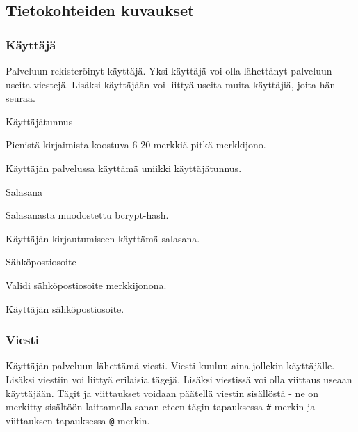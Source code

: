 \documentclass{article}
\begin{document}
\subsection{Tietokohteiden kuvaukset}

\subsubsection{Käyttäjä}

Palveluun rekisteröinyt käyttäjä. Yksi käyttäjä voi olla lähettänyt palveluun useita viestejä. Lisäksi käyttäjään voi liittyä useita muita käyttäjiä, joita hän seuraa.

\begin{description}[itemsep=0pt]
    \item[Attribuutti] Käyttäjätunnus
    \item[Arvojoukko] Pienistä kirjaimista koostuva 6-20 merkkiä pitkä merkkijono.
    \item[Kuvailu] Käyttäjän palvelussa käyttämä uniikki käyttäjätunnus.
\end{description}

\begin{description}[itemsep=0pt]
    \item[Attribuutti] Salasana
    \item[Arvojoukko] Salasanasta muodostettu bcrypt-hash.
    \item[Kuvailu] Käyttäjän kirjautumiseen käyttämä salasana.
\end{description}

\begin{description}[itemsep=0pt]
    \item[Attribuutti] Sähköpostiosoite
    \item[Arvojoukko] Validi sähköpostiosoite merkkijonona.
    \item[Kuvailu] Käyttäjän sähköpostiosoite.
\end{description}


\subsubsection{Viesti}

Käyttäjän palveluun lähettämä viesti. Viesti kuuluu aina jollekin käyttäjälle. Lisäksi viestiin voi liittyä erilaisia tägejä. Lisäksi viestissä voi olla viittaus useaan käyttäjään. Tägit ja viittaukset voidaan päätellä viestin sisällöstä - ne on merkitty sisältöön laittamalla sanan eteen tägin tapauksessa \verb+#+-merkin ja viittauksen tapauksessa \verb+@+-merkin.
\end{document}
